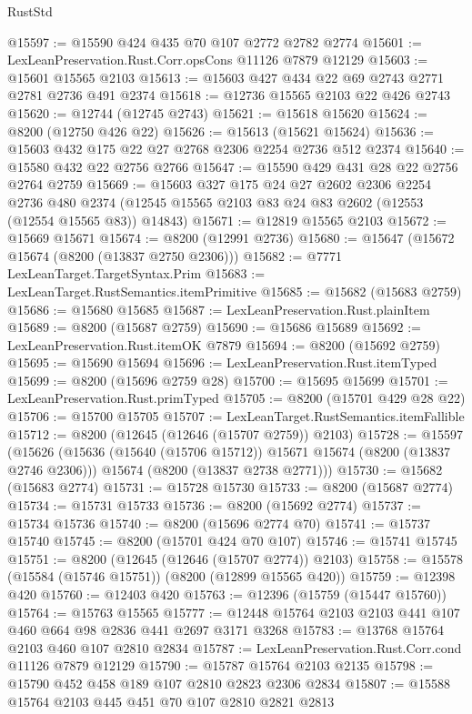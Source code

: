\begin{lexlean}{RustStd}
\begin{coremodule}
@15597 := @15590 @424 @435 @70 @107 @2772 @2782 @2774
@15601 := LexLeanPreservation.Rust.Corr.opsCons @11126 @7879 @12129
@15603 := @15601 @15565 @2103
@15613 := @15603 @427 @434 @22 @69 @2743 @2771 @2781 @2736 @491 @2374
@15618 := @12736 @15565 @2103 @22 @426 @2743
@15620 := @12744 (@12745 @2743)
@15621 := @15618 @15620
@15624 := @8200 (@12750 @426 @22)
@15626 := @15613 (@15621 @15624)
@15636 := @15603 @432 @175 @22 @27 @2768 @2306 @2254 @2736 @512 @2374
@15640 := @15580 @432 @22 @2756 @2766
@15647 := @15590 @429 @431 @28 @22 @2756 @2764 @2759
@15669 := @15603
    @327
    @175
    @24
    @27
    @2602
    @2306
    @2254
    @2736
    @480
    @2374
    (@12545 @15565 @2103 @83 @24 @83 @2602 (@12553 (@12554 @15565 @83)) @14843)
@15671 := @12819 @15565 @2103
@15672 := @15669 @15671
@15674 := @8200 (@12991 @2736)
@15680 := @15647 (@15672 @15674 (@8200 (@13837 @2750 @2306)))
@15682 := @7771 LexLeanTarget.TargetSyntax.Prim
@15683 := LexLeanTarget.RustSemantics.itemPrimitive
@15685 := @15682 (@15683 @2759)
@15686 := @15680 @15685
@15687 := LexLeanPreservation.Rust.plainItem
@15689 := @8200 (@15687 @2759)
@15690 := @15686 @15689
@15692 := LexLeanPreservation.Rust.itemOK @7879
@15694 := @8200 (@15692 @2759)
@15695 := @15690 @15694
@15696 := LexLeanPreservation.Rust.itemTyped
@15699 := @8200 (@15696 @2759 @28)
@15700 := @15695 @15699
@15701 := LexLeanPreservation.Rust.primTyped
@15705 := @8200 (@15701 @429 @28 @22)
@15706 := @15700 @15705
@15707 := LexLeanTarget.RustSemantics.itemFallible
@15712 := @8200 (@12645 (@12646 (@15707 @2759)) @2103)
@15728 := @15597
    (@15626
      (@15636 (@15640 (@15706 @15712)) @15671 @15674 (@8200 (@13837 @2746 @2306)))
      @15674
      (@8200 (@13837 @2738 @2771)))
@15730 := @15682 (@15683 @2774)
@15731 := @15728 @15730
@15733 := @8200 (@15687 @2774)
@15734 := @15731 @15733
@15736 := @8200 (@15692 @2774)
@15737 := @15734 @15736
@15740 := @8200 (@15696 @2774 @70)
@15741 := @15737 @15740
@15745 := @8200 (@15701 @424 @70 @107)
@15746 := @15741 @15745
@15751 := @8200 (@12645 (@12646 (@15707 @2774)) @2103)
@15758 := @15578 (@15584 (@15746 @15751)) (@8200 (@12899 @15565 @420))
@15759 := @12398 @420
@15760 := @12403 @420
@15763 := @12396 (@15759 (@15447 @15760))
@15764 := @15763 @15565
@15777 := @12448 @15764 @2103 @2103 @441 @107 @460 @664 @98 @2836 @441 @2697 @3171 @3268
@15783 := @13768 @15764 @2103 @460 @107 @2810 @2834
@15787 := LexLeanPreservation.Rust.Corr.cond @11126 @7879 @12129
@15790 := @15787 @15764 @2103 @2135
@15798 := @15790 @452 @458 @189 @107 @2810 @2823 @2306 @2834
@15807 := @15588 @15764 @2103 @445 @451 @70 @107 @2810 @2821 @2813

\end{coremodule}
\end{lexlean}
